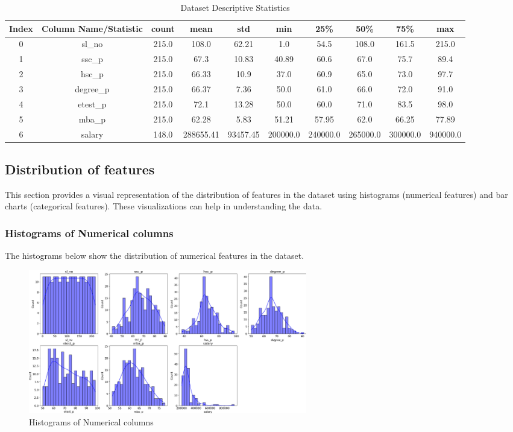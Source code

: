 \documentclass{article}%
\begin{document}
\begin{table}[h!]%
\caption{Dataset Descriptive Statistics}%
\vspace{0.2cm}%
\centering%
\begin{tabular}{|c||c||c||c||c||c||c||c||c||c|}%
\hline%
Index&Column Name/Statistic&count&mean&std&min&25\%&50\%&75\%&max\\%
\hline%
0&sl\_no&215.0&108.0&62.21&1.0&54.5&108.0&161.5&215.0\\%
1&ssc\_p&215.0&67.3&10.83&40.89&60.6&67.0&75.7&89.4\\%
2&hsc\_p&215.0&66.33&10.9&37.0&60.9&65.0&73.0&97.7\\%
3&degree\_p&215.0&66.37&7.36&50.0&61.0&66.0&72.0&91.0\\%
4&etest\_p&215.0&72.1&13.28&50.0&60.0&71.0&83.5&98.0\\%
5&mba\_p&215.0&62.28&5.83&51.21&57.95&62.0&66.25&77.89\\%
6&salary&148.0&288655.41&93457.45&200000.0&240000.0&265000.0&300000.0&940000.0\\%
\hline%
\end{tabular}%
\end{table}

%
\newpage%
\subsection{Distribution of features}%
\label{subsec:Distributionoffeatures}%
This section provides a visual representation of the distribution of features in the dataset using histograms (numerical features) and bar charts (categorical features). These visualizations can help in understanding the data.%
\subsubsection{Histograms of Numerical columns}%
\label{ssubsec:HistogramsofNumericalcolumns}%
The histograms below show the distribution of numerical features in the dataset.%


\begin{figure}[h!]%
\centering%
\includegraphics[width=460px]{EDA/histograms.png}%
\caption{Histograms of Numerical columns}%
\end{figure}
\end{document}
